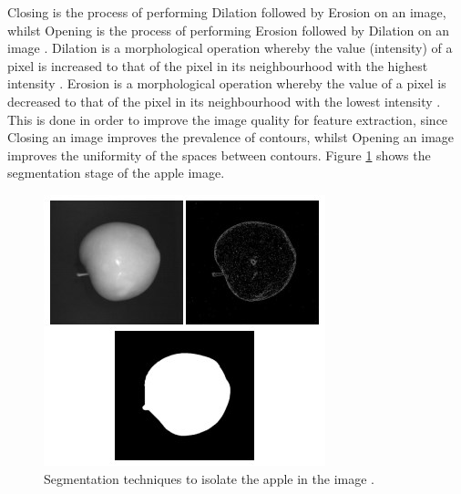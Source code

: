 \documentclass[conference]{IEEEtran}
\begin{document}
Closing is the process of performing Dilation followed by Erosion on an image, whilst Opening is the process of performing Erosion followed by Dilation on an image \cite{opening,closing}.
Dilation is a morphological operation whereby the value (intensity) of a pixel is increased to that of the pixel in its neighbourhood with the highest intensity \cite{mathworksdilationerosion}.
Erosion is a morphological operation whereby the value of a pixel is decreased to that of the pixel in its neighbourhood with the lowest intensity \cite{mathworksdilationerosion}.
This is done in order to improve the image quality for feature extraction, since Closing an image improves the prevalence of contours, whilst Opening an image improves the uniformity of the spaces between contours.
Figure \ref{fig:segmentedapples} shows the segmentation stage of the apple image.
\begin{figure}
    \centering
    \includegraphics[width=\linewidth]{segmentedapples.jpg}
    \caption{Segmentation techniques to isolate the apple in the image \cite{comert}.}
    \label{fig:segmentedapples}
\end{figure}
\end{document}
